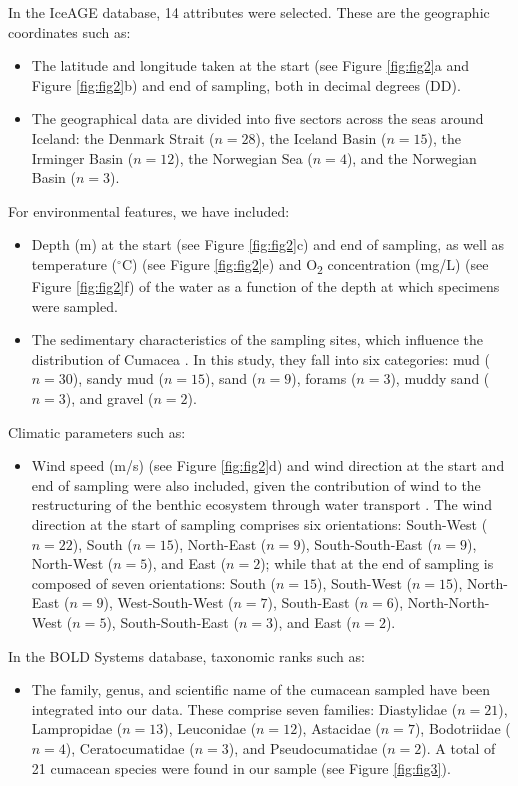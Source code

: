 In the IceAGE database, 14 attributes were selected. These are the geographic coordinates such as: 

\begin{itemize}
\item The latitude and longitude taken at the start (see Figure \ref{fig:fig2}a and Figure \ref{fig:fig2}b) and end of sampling, both in decimal degrees (DD).
\item The geographical data are divided into five sectors across the seas around Iceland: the Denmark Strait ($n=28$), the Iceland Basin ($n=15$), the Irminger Basin ($n=12$), the Norwegian Sea ($n=4$), and the Norwegian Basin ($n=3$). 
\end{itemize}

For environmental features, we have included:
\begin{itemize}
\item Depth (m) at the start (see Figure \ref{fig:fig2}c) and end of sampling, as well as temperature ($^\circ$C) (see Figure \ref{fig:fig2}e) and O\textsubscript{2} concentration (mg/L) (see Figure \ref{fig:fig2}f) of the water as a function of the depth at which specimens were sampled. 
\item The sedimentary characteristics of the sampling sites, which influence the distribution of Cumacea \citep{uhlir_adding_2021}. In this study, they fall into six categories: mud ($n=30$), sandy mud ($n=15$), sand ($n=9$), forams ($n=3$), muddy sand ($n=3$), and gravel ($n=2$).
\end{itemize}

Climatic parameters such as: 
\begin{itemize}
\item Wind speed (m/s) (see Figure \ref{fig:fig2}d) and wind direction at the start and end of sampling were also included, given the contribution of wind to the restructuring of the benthic ecosystem through water transport \citep{waga_recent_2020,saeedi_environmental_2022}. The wind direction at the start of sampling comprises six orientations: South-West ($n=22$), South ($n=15$), North-East ($n=9$), South-South-East ($n=9$), North-West ($n=5$), and East ($n=2$); while that at the end of sampling is composed of seven orientations: South ($n=15$), South-West ($n=15$), North-East ($n=9$), West-South-West ($n=7$), South-East ($n=6$), North-North-West ($n=5$), South-South-East ($n=3$), and East ($n=2$). 
\end{itemize}

In the BOLD Systems database, taxonomic ranks such as: 
\begin{itemize}
\item The family, genus, and scientific name of the cumacean sampled have been integrated into our data. These comprise seven families: Diastylidae ($n=21$), Lampropidae ($n=13$), Leuconidae ($n=12$), Astacidae ($n=7$), Bodotriidae ($n=4$), Ceratocumatidae ($n=3$), and Pseudocumatidae ($n=2$). A total of 21 cumacean species were found in our sample (see Figure \ref{fig:fig3}).
\end{itemize}

